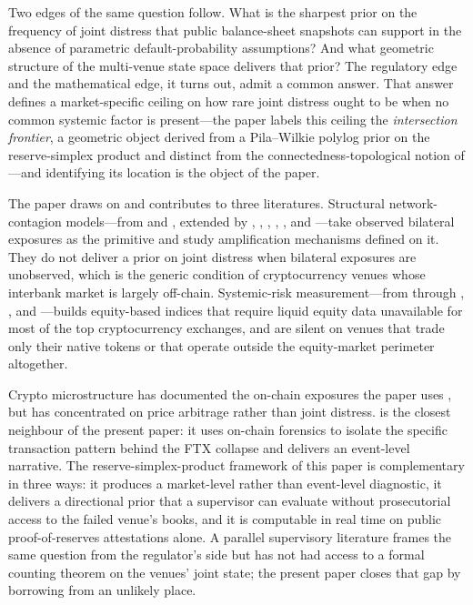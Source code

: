Two edges of the same question follow. What is the sharpest prior on
the frequency of joint distress that public balance-sheet snapshots
can support in the absence of parametric default-probability
assumptions? And what geometric structure of the multi-venue state
space delivers that prior? The regulatory edge and the mathematical
edge, it turns out, admit a common answer. That answer defines a
market-specific ceiling on how rare joint distress ought to be when
no common systemic factor is present---the paper labels this ceiling
the \emph{intersection frontier}, a geometric object derived from a
Pila--Wilkie polylog prior on the reserve-simplex product and distinct
from the connectedness-topological notion of
\citet{DieboldYilmaz2014}---and identifying its location is the
object of the paper.

The paper draws on and contributes to three literatures.
Structural network-contagion models---from \citet{AllenGale2000} and
\citet{FreixasParigiRochet2000}, extended by
\citet{EliottGolubJackson2014}, \citet{AcemogluOzdaglarTahbaz2015},
\citet{GlassermanYoung2015}, \citet{RochetTirole1996},
\citet{CabralesGaleGottardi2016}, and \citet{DuffieZhu2011}---take
observed bilateral exposures as the primitive and study amplification
mechanisms defined on it. They do not deliver a prior on joint
distress when bilateral exposures are unobserved, which is the
generic condition of cryptocurrency venues whose interbank market is
largely off-chain. Systemic-risk measurement---from
\citet{AdrianBrunnermeier2016CoVaR} through
\citet{AchariaEtAl2017SES}, \citet{BrownleesEngle2017SRISK}, and
\citet{BillioEtAl2012}---builds equity-based indices that require
liquid equity data unavailable for most of the top cryptocurrency
exchanges, and are silent on venues that trade only their native
tokens or that operate outside the equity-market perimeter altogether.

Crypto microstructure has documented the on-chain exposures the paper
uses \citep{MakarovSchoar2020, GriffinShams2020,
Griffin-Kruger-Mei2023, FooterKarolyi2023, AlexanderDeng2023,
Cong-Li-Wang2021, FootcaultFuchsGoyalKaplan2024,
LiuTsyvinski2021, GofmanUeda2023,
Aramonte-Huang-Schrimpf2021, Fahlenbrach-Kirchler-Kremer2024},
but has concentrated on price arbitrage rather than joint distress.
\citet{Griffin-Kruger-Mei2023} is the closest neighbour of the
present paper: it uses on-chain forensics to isolate the specific
transaction pattern behind the FTX collapse and delivers an
event-level narrative. The reserve-simplex-product framework of
this paper is complementary in three ways: it produces a market-level
rather than event-level diagnostic, it delivers a directional prior
that a supervisor can evaluate without prosecutorial access to the
failed venue's books, and it is computable in real time on public
proof-of-reserves attestations alone. A parallel supervisory
literature \citep{BCBS2021Crypto, FSB2023Crypto, Aldasoro2023Stablecoin}
frames the same question from the regulator's side but has not had
access to a formal counting theorem on the venues' joint state;
the present paper closes that gap by borrowing from an unlikely
place.

